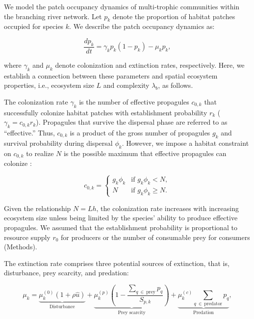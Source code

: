 \documentclass[11pt, class=article, crop=false]{standalone}
\begin{document}
We model the patch occupancy dynamics of multi-trophic communities within the branching river network.
Let $p_k$ denote the proportion of habitat patches occupied for species $k$.
We describe the patch occupancy dynamics as:

\begin{equation}
    \frac{dp_k}{dt} = \gamma_{k} p_k (1 - p_k) - \mu_k p_k,
    \label{eq:model0}
\end{equation}

where $\gamma_k$ and $\mu_k$ denote colonization and extinction rates, respectively.
Here, we establish a connection between these parameters and spatial ecosystem properties, i.e., ecosystem size $L$ and complexity $\lambda_b$, as follows.

The colonization rate $\gamma_k$ is the number of effective propagules $c_{0,k}$ that successfully colonize habitat patches with establishment probability $r_k$ ($\gamma_k = c_{0,k} r_k$).
Propagules that survive the dispersal phase are referred to as ``effective.'' Thus, $c_{0,k}$ is a product of the gross number of propagules $g_k$ and survival probability during dispersal $\phi_k$.
However, we impose a habitat constraint on $c_{0,k}$ to realize $N$ is the possible maximum that effective propagules can colonize \citep{takimoto_effects_2012, terui_spatial_2019}:

\begin{equation}
    c_{0, k} = 
    \begin{cases}
        g_k \phi_k & \text{if $g_k \phi_k < N$},\\
        N & \text{if $g_k \phi_k \ge N$}.
    \end{cases}
    \label{eq:c0-prod}
\end{equation}

Given the relationship $N = Lh$, the colonization rate increases with increasing ecosystem size unless being limited by the species' ability to produce effective propagules.
We assumed that the establishment probability is proportional to resource supply $r_0$ for producers or the number of consumable prey for consumers (Methods).

The extinction rate comprises three potential sources of extinction, that is, disturbance, prey scarcity, and predation:

\begin{equation}
    \mu_{k} = 
        \underbrace{\mu_{k}^{(0)} (1 + \rho \hat{u})}_{\text{Disturbance}} + 
        \underbrace{\mu_{k}^{(p)} \left(1 - \frac{\sum_{q~\in~\text{prey}} p_{q}}{S_{p, k}} \right)}_{\text{Prey scarcity}} + 
        \underbrace{\mu_{k}^{(c)} \sum_{q~\in~\text{predator}} p_{q}}_{\text{Predation}},
    \label{eq:extn}    
\end{equation}
\end{document}
